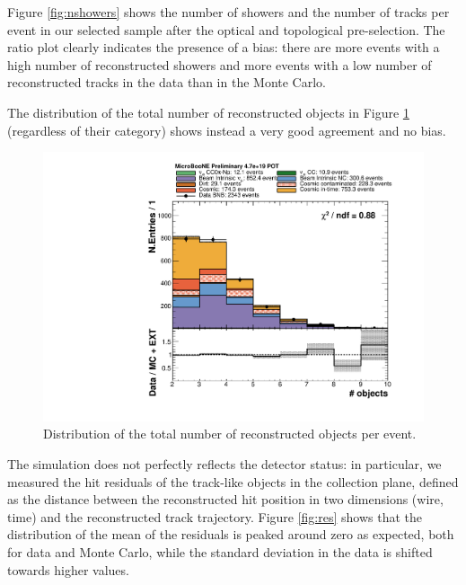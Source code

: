 Figure \ref{fig:nshowers} shows the number of showers and the number of tracks per event in our selected sample after the optical and topological pre-selection. The ratio plot clearly indicates the presence of a bias: there are more events with a high number of reconstructed showers and more events with a low number of reconstructed tracks in the data than in the Monte Carlo. 


The distribution of the total number of reconstructed objects in Figure \ref{fig:nobjects} (regardless of their category) shows instead a very good agreement and no bias.

\begin{figure}[htbp]
\centering
  \includegraphics[width=0.65\linewidth]{figures/h_n_objects.pdf}
  \caption{Distribution of the total number of reconstructed objects per event.}
  \label{fig:nobjects}
\end{figure}

The simulation does not perfectly reflects the detector status: in particular, we measured the hit residuals of the track-like objects in the collection plane, defined as the distance between the reconstructed hit position in two dimensions (wire, time) and the reconstructed track trajectory. Figure \ref{fig:res} shows that the distribution of the mean of the residuals is peaked around zero as expected, both for data and Monte Carlo, while the standard deviation in the data is shifted towards higher values. 

